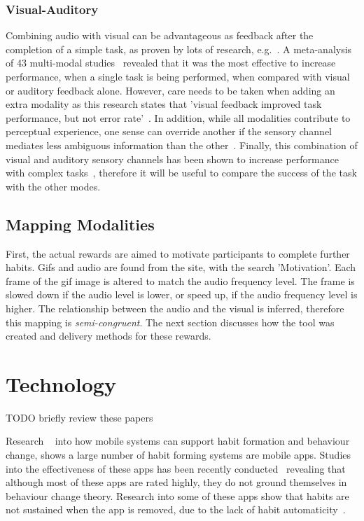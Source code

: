 \documentclass{scaffold/sigchi}
\begin{document}
\subsubsection{Visual-Auditory}
Combining audio with visual can be advantageous as feedback after the completion of a simple task, as proven by lots of research, e.g.~\cite{benefits_of_audio_visual_1, benefits_of_audio_visual_2}. A meta-analysis of 43 multi-modal studies~\cite{comparing_modalities_effects_of_visual_auditory} revealed that it was the most effective to increase performance, when a single task is being performed, when compared with visual or auditory feedback alone. However, care needs to be taken when adding an extra modality as this research states that 'visual feedback improved task performance, but not error rate'~\cite{comparing_modalities_effects_of_visual_auditory}. In addition, while all modalities contribute to perceptual experience, one sense can override another if the sensory channel mediates less ambiguous information than the other~\cite{one_mode_override_another}. Finally, this combination of visual and auditory sensory channels has been shown to increase performance with complex tasks~\cite{chi_oussama_tap_the_shapetones}, therefore it will be useful to compare the success of the task with the other modes.
\subsection{Mapping Modalities}
First, the actual rewards are aimed to motivate participants to complete further habits. Gifs and audio are found from the site, with the search 'Motivation'. Each frame of the gif image is altered to match the audio frequency level. The frame is slowed down if the audio level is lower, or speed up, if the audio frequency level is higher. The relationship between the audio and the visual is inferred, therefore this mapping is \textit{semi-congruent}. The next section discusses how the tool was created and delivery methods for these rewards.
\section{Technology}
TODO briefly review these papers\cite{chi_mechanics_of_persuasive_system_design, chi_time_aware_leveraging_framing_effects, personal_tracking_of_screen_time, chi_crowd_designed_motivation}

Research ~\cite{survey_on_apps_2,survey_on_current_apps_of_steel} into how mobile systems can support habit formation and behaviour change, shows a large number of habit forming systems are mobile apps. Studies into the effectiveness of these apps has been recently conducted~\cite{article_beyond_self_tracking_designing_apps, article_dont_kick_habit} revealing that although most of these apps are rated highly, they do not ground themselves in behaviour change theory. Research into some of these apps show that habits are not sustained when the app is removed, due to the lack of habit automaticity~\cite{article_beyond_self_tracking_designing_apps}.
\end{document}
